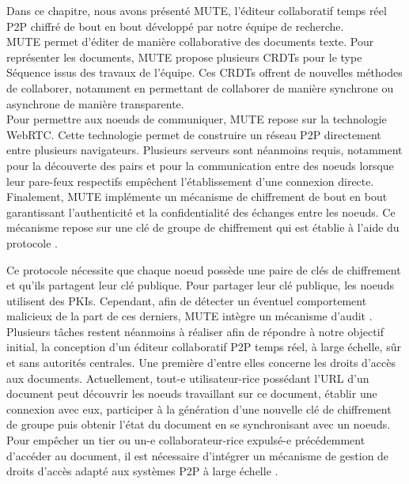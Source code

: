 Dans ce chapitre, nous avons présenté \acf{MUTE}, l'éditeur collaboratif temps réel \ac{P2P} chiffré de bout en bout développé par notre équipe de recherche.\\

MUTE permet d'éditer de manière collaborative des documents texte.
Pour représenter les documents, MUTE propose plusieurs \acp{CRDT} pour le type Séquence \cite{2013-logootsplit,2021-these-vic,2022-rls-tpds-nicolas} issus des travaux de l'équipe.
Ces \acp{CRDT} offrent de nouvelles méthodes de collaborer, notamment en permettant de collaborer de manière synchrone ou asynchrone de manière transparente.\\

Pour permettre aux noeuds de communiquer, MUTE repose sur la technologie \acf{WebRTC}.
Cette technologie permet de construire un réseau \ac{P2P} directement entre plusieurs navigateurs.
Plusieurs serveurs sont néanmoins requis, notamment pour la découverte des pairs et pour la communication entre des noeuds lorsque leur pare-feux respectifs empêchent l'établissement d'une connexion directe.\\

Finalement, MUTE implémente un mécanisme de chiffrement de bout en bout garantissant l'authenticité et la confidentialité des échanges entre les noeuds.
Ce mécanisme repose sur une clé de groupe de chiffrement qui est établie à l'aide du protocole \cite{1995-burmester-desmedt}.

Ce protocole nécessite que chaque noeud possède une paire de clés de chiffrement et qu'ils partagent leur clé publique.
Pour partager leur clé publique, les noeuds utilisent des \acfp{PKI}.
Cependant, afin de détecter un éventuel comportement malicieux de la part de ces derniers, \ac{MUTE} intègre un mécanisme d'audit \cite{2018-trusternity-short,2018-trusternity-long}.\\

Plusieurs tâches restent néanmoins à réaliser afin de répondre à notre objectif initial, \ie la conception d'un éditeur collaboratif \ac{P2P} temps réel, à large échelle, sûr et sans autorités centrales.
Une première d'entre elles concerne les droits d'accès aux documents.
Actuellement, tout-e utilisateur-rice possédant l'URL d'un document peut découvrir les noeuds travaillant sur ce document, établir une connexion avec eux, participer à la génération d'une nouvelle clé de chiffrement de groupe puis obtenir l'état du document en se synchronisant avec un noeuds.
Pour empêcher un tier ou un-e collaborateur-rice expulsé-e précédemment d'accéder au document, il est nécessaire d'intégrer un mécanisme de gestion de droits d'accès adapté aux systèmes \ac{P2P} à large échelle \cite{2021-access-control-crdts,2022-dist-access-control-pa}.\\

